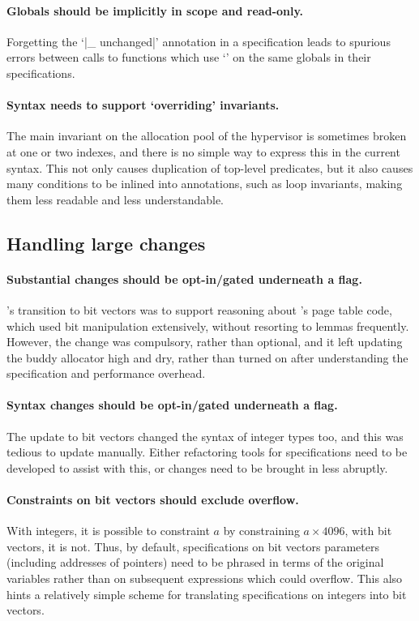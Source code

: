 \paragraph{Globals should be implicitly in scope and read-only.} Forgetting the
`\cninline|{_} unchanged|' annotation in a specification leads to spurious
errors between calls to functions which use `' on the same
globals in their specifications.

\paragraph{Syntax needs to support `overriding' invariants.} The main invariant
on the allocation pool of the hypervisor is sometimes broken at one or two
indexes, and there is no simple way to express this in the current syntax. This
not only causes duplication of top-level predicates, but it also causes many
conditions to be inlined into annotations, such as loop invariants, making them
less readable and less understandable.

\subsection{Handling large changes}\label{subsec:handling-large-changes}

\paragraph{Substantial changes should be opt-in/gated underneath a flag.}
's transition to bit vectors was to support reasoning about 's
page table code, which used bit manipulation extensively, without resorting to
lemmas frequently. However, the change was compulsory, rather than optional,
and it left updating the buddy allocator high and dry, rather than turned on
after understanding the specification and performance overhead.

\paragraph{Syntax changes should be opt-in/gated underneath a flag.} The update
to bit vectors changed the syntax of integer types too, and this was tedious to
update manually. Either refactoring tools for specifications need to be
developed to assist with this, or changes need to be brought in less abruptly.

\paragraph{Constraints on bit vectors should exclude overflow.} With integers,
it is possible to constraint $a$ by constraining $a \times{} 4096$, with bit
vectors, it is not. Thus, by default, specifications on bit vectors parameters
(including addresses of pointers) need to be phrased in terms of the original
variables rather than on subsequent expressions which could overflow. This also
hints a relatively simple scheme for translating specifications on integers
into bit vectors.

